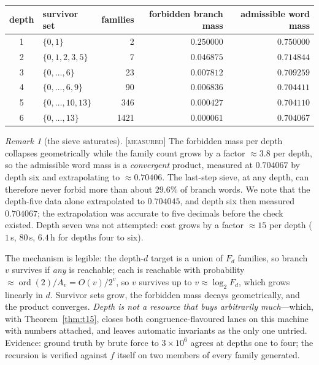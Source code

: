 \documentclass[11pt]{article}
\theoremstyle{definition}
\theoremstyle{remark}
\newtheorem{remark}[theorem]{Remark}
\newcommand{\ord}{\operatorname{ord}}
\newcommand{\Meas}{\textsc{[measured]}}
\begin{document}
\begin{center}
\small
\begin{tabular}{@{}clrrr@{}}
\toprule
depth & survivor set & families & forbidden branch mass & admissible word mass\\
\midrule
1 & $\{0,1\}$ & 2 & $0.250000$ & $0.750000$\\
2 & $\{0,1,2,3,5\}$ & 7 & $0.046875$ & $0.714844$\\
3 & $\{0,\dots,6\}$ & 23 & $0.007812$ & $0.709259$\\
4 & $\{0,\dots,6,9\}$ & 90 & $0.006836$ & $0.704411$\\
5 & $\{0,\dots,10,13\}$ & 346 & $0.000427$ & $0.704110$\\
6 & $\{0,\dots,13\}$ & 1421 & $0.000061$ & $0.704067$\\
\bottomrule
\end{tabular}
\end{center}

\begin{remark}[the sieve saturates]\label{rem:sheep-ladder}
\Meas\; The forbidden mass per depth collapses geometrically while the family
count grows by a factor $\approx3.8$ per depth, so the admissible word mass is
a \emph{convergent} product, measured at $0.704067$ by depth six and
extrapolating to $\approx0.70406$.  The last-step sieve, at any depth, can
therefore never forbid more than about $29.6\%$ of branch words.  We note that
the depth-five data alone extrapolated to $0.704045$, and depth six then
measured $0.704067$; the extrapolation was accurate to five decimals before
the check existed.  Depth seven was not attempted: cost grows by a factor
$\approx15$ per depth ($1$\,s, $80$\,s, $6.4$\,h for depths four to six).
\end{remark}

The mechanism is legible: the depth-$d$ target is a union of $F_d$ families,
so branch $v$ survives if \emph{any} is reachable; each is reachable with
probability $\approx\ord(2)/A_v=O(v)/2^v$, so $v$ survives up to
$v\approx\log_2 F_d$, which grows linearly in $d$.  Survivor sets grow, the
forbidden mass decays geometrically, and the product converges.  \emph{Depth
is not a resource that buys arbitrarily much}---which, with
Theorem~\ref{thm:t15}, closes both congruence-flavoured lanes on this machine
with numbers attached, and leaves automatic invariants as the only one
untried.  Evidence: ground truth by brute force to $3\times10^6$ agrees at
depths one to four; the recursion is verified against $f$ itself on two
members of every family generated.
\end{document}
